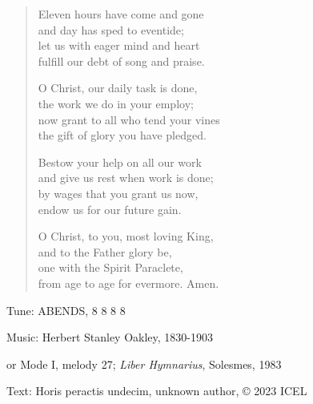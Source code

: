\hymn

\begin{verse}
Eleven hours have come and gone\\
and day has sped to eventide;\\
let us with eager mind and heart\\
fulfill our debt of song and praise.

O Christ, our daily task is done,\\
the work we do in your employ;\\
now grant to all who tend your vines\\
the gift of glory you have pledged.

Bestow your help on all our work\\
and give us rest when work is done;\\
by wages that you grant us now,\\
endow us for our future gain.

O Christ, to you, most loving King,\\
and to the Father glory be,\\
one with the Spirit Paraclete,\\
from age to age for evermore. Amen.
\end{verse}

\begin{hymnsource}
Tune: ABENDS, 8 8 8 8

Music: Herbert Stanley Oakley, 1830-1903

or Mode I, melody 27; \emph{Liber Hymnarius}, Solesmes, 1983

Text: Horis peractis undecim, unknown author, © 2023 ICEL
\end{hymnsource}
